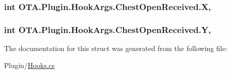 \subsubsection[{X}]{\setlength{\rightskip}{0pt plus 5cm}int O\+T\+A.\+Plugin.\+Hook\+Args.\+Chest\+Open\+Received.\+X\hspace{0.3cm}{\ttfamily [get]}, {\ttfamily [set]}}\label{struct_o_t_a_1_1_plugin_1_1_hook_args_1_1_chest_open_received_ac4d2ea25bf6f8a10874189d8e78912d9}
\hypertarget{struct_o_t_a_1_1_plugin_1_1_hook_args_1_1_chest_open_received_acf257ce983bdcf5049a55a621ef19f12}{}
\subsubsection[{Y}]{\setlength{\rightskip}{0pt plus 5cm}int O\+T\+A.\+Plugin.\+Hook\+Args.\+Chest\+Open\+Received.\+Y\hspace{0.3cm}{\ttfamily [get]}, {\ttfamily [set]}}\label{struct_o_t_a_1_1_plugin_1_1_hook_args_1_1_chest_open_received_acf257ce983bdcf5049a55a621ef19f12}


The documentation for this struct was generated from the following file\+:\begin{DoxyCompactItemize}
\item 
Plugin/\hyperlink{_hooks_8cs}{Hooks.\+cs}\end{DoxyCompactItemize}
